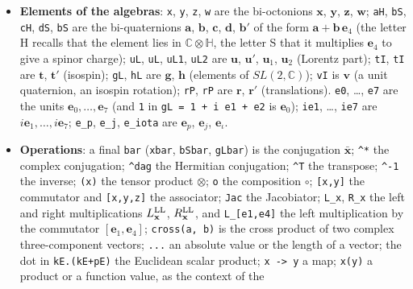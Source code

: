 \documentclass[
  10pt,
]{article}
\providecommand{\tightlist}{%
  \setlength{\itemsep}{0pt}\setlength{\parskip}{0pt}}
\begin{document}
\begin{itemize}
\tightlist
\item
  \textbf{Elements of the algebras}: \texttt{x}, \texttt{y}, \texttt{z},
  \texttt{w} are the bi-octonions \(\mathbf x\), \(\mathbf y\),
  \(\mathbf z\), \(\mathbf w\); \texttt{aH}, \texttt{bS}, \texttt{cH},
  \texttt{dS}, \texttt{bS\textquotesingle{}} are the bi-quaternions
  \(\mathbf a\), \(\mathbf b\), \(\mathbf c\), \(\mathbf d\),
  \(\mathbf b'\) of the form \(\mathbf a+\mathbf b\,\mathbf e_4\) (the
  letter H recalls that the element lies in
  \(\mathbb C\otimes\mathbb H\), the letter S that it multiplies
  \(\mathbf e_4\) to give a spinor charge); \texttt{uL},
  \texttt{uL\textquotesingle{}}, \texttt{uL1}, \texttt{uL2} are
  \(\mathbf u\), \(\mathbf u'\), \(\mathbf u_1\), \(\mathbf u_2\)
  (Lorentz part); \texttt{tI}, \texttt{tI\textquotesingle{}} are
  \(\mathbf t\), \(\mathbf t'\) (isospin); \texttt{gL}, \texttt{hL} are
  \(\mathbf g\), \(\mathbf h\) (elements of \(SL(2,\mathbb C)\));
  \texttt{vI} is \(\mathbf v\) (a unit quaternion, an isospin rotation);
  \texttt{rP}, \texttt{rP\textquotesingle{}} are \(\mathbf r\),
  \(\mathbf r'\) (translations). \texttt{e0}, \ldots, \texttt{e7} are
  the units \(\mathbf e_0,\dots,\mathbf e_7\) (and \texttt{1} in
  \texttt{gL\ =\ 1\ +\ i\ e1\ +\ e2} is \(\mathbf e_0\)); \texttt{ie1},
  \ldots, \texttt{ie7} are \(i\mathbf e_1,\dots,i\mathbf e_7\);
  \texttt{e\_p}, \texttt{e\_j}, \texttt{e\_iota} are \(\mathbf e_p\),
  \(\mathbf e_j\), \(\mathbf e_\iota\).
\item
  \textbf{Operations}: a final \texttt{bar} (\texttt{xbar},
  \texttt{bSbar}, \texttt{gLbar}) is the conjugation
  \(\bar{\mathbf x}\); \texttt{\^{}*} the complex conjugation;
  \texttt{\^{}dag} the Hermitian conjugation; \texttt{\^{}T} the
  transpose; \texttt{\^{}-1} the inverse; \texttt{(x)} the tensor
  product \(\otimes\); \texttt{o} the composition \(\circ\);
  \texttt{{[}x,y{]}} the commutator and \texttt{{[}x,y,z{]}} the
  associator; \texttt{Jac} the Jacobiator; \texttt{L\_x}, \texttt{R\_x}
  the left and right multiplications \(L^{\rm LL}_{\mathbf x}\),
  \(R^{\rm LL}_{\mathbf x}\), and \texttt{L\_{[}e1,e4{]}} the left
  multiplication by the commutator \([\mathbf e_1,\mathbf e_4]\);
  \texttt{cross(a,\ b)} is the cross product of two complex
  three-component vectors; \texttt{\textbar{}...\textbar{}} an absolute
  value or the length of a vector; the dot in \texttt{kE.(kE+pE)} the
  Euclidean scalar product; \texttt{x\ -\textgreater{}\ y} a map;
  \texttt{x(y)} a product or a function value, as the context of the

\end{itemize}
\end{document}
